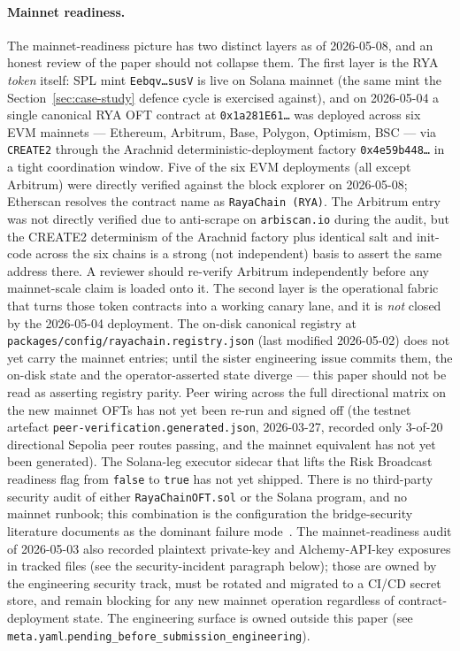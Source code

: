 \documentclass[11pt,a4paper]{article}
\begin{document}
\paragraph{Mainnet readiness.} The mainnet-readiness picture has two
distinct layers as of 2026-05-08, and an honest review of the paper
should not collapse them. The first layer is the RYA \emph{token}
itself: SPL mint \texttt{Eebqv\dots susV} is live on Solana mainnet
(the same mint the Section~\ref{sec:case-study} defence cycle is
exercised against), and on 2026-05-04 a single canonical RYA OFT
contract at \texttt{0x1a281E61\dots} was deployed across six EVM
mainnets --- Ethereum, Arbitrum, Base, Polygon, Optimism, BSC --- via
\texttt{CREATE2} through the Arachnid deterministic-deployment factory
\texttt{0x4e59b448\dots} in a tight coordination window. Five of the
six EVM deployments (all except Arbitrum) were directly verified
against the block explorer on 2026-05-08; Etherscan resolves the
contract name as \texttt{RayaChain (RYA)}. The Arbitrum entry was not
directly verified due to anti-scrape on \texttt{arbiscan.io} during the
audit, but the CREATE2 determinism of the Arachnid factory plus
identical salt and init-code across the six chains is a strong (not
independent) basis to assert the same address there. A reviewer should
re-verify Arbitrum independently before any mainnet-scale claim is
loaded onto it. The second layer is the operational fabric that turns
those token contracts into a working canary lane, and it is
\emph{not} closed by the 2026-05-04 deployment. The on-disk canonical
registry at \texttt{packages/config/rayachain.registry.json} (last
modified 2026-05-02) does not yet carry the mainnet entries; until the
sister engineering issue commits them, the on-disk state and the
operator-asserted state diverge --- this paper should not be read as
asserting registry parity. Peer wiring across the full directional
matrix on the new mainnet OFTs has not yet been re-run and signed off
(the testnet artefact \texttt{peer-verification.generated.json},
2026-03-27, recorded only 3-of-20 directional Sepolia peer routes
passing, and the mainnet equivalent has not yet been generated). The
Solana-leg executor sidecar that lifts the Risk Broadcast readiness
flag from \texttt{false} to \texttt{true} has not yet shipped. There
is no third-party security audit of either \texttt{RayaChainOFT.sol}
or the Solana program, and no mainnet runbook; this combination is
the configuration the bridge-security literature documents as the
dominant failure
mode~\cite{zhang2023sok,augusto2024sok}. The mainnet-readiness audit
of 2026-05-03 also recorded plaintext private-key and Alchemy-API-key
exposures in tracked files (see the security-incident paragraph
below); those are owned by the engineering security track, must be
rotated and migrated to a CI/CD secret store, and remain blocking for
any new mainnet operation regardless of contract-deployment state. The
engineering surface is owned outside this paper (see
\texttt{meta.yaml}.\texttt{pending\_before\_submission\_engineering}).
\end{document}
